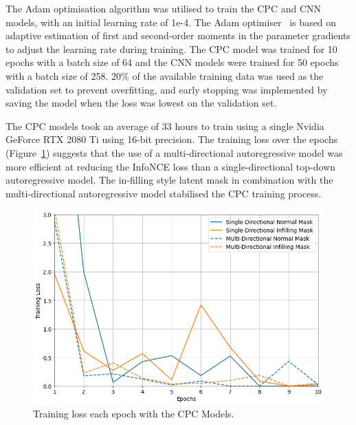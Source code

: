 The Adam optimisation algorithm was utilised to train the CPC and CNN models, with an initial learning rate of 1e-4. The Adam optimiser~\citep{kingma2014adam} is based on adaptive estimation of first and second-order moments in the parameter gradients to adjust the learning rate during training. The CPC model was trained for 10 epochs with a batch size of 64 and the CNN models were trained for 50 epochs with a batch size of 258. 20\% of the available training data was used as the validation set to prevent overfitting, and early stopping was implemented by saving the model when the loss was lowest on the validation set. 

The CPC models took an average of 33 hours to train using a single Nvidia GeForce RTX 2080 Ti using 16-bit precision. The training loss over the epochs (Figure~\ref{fig:cpc_training}) suggests that the use of a multi-directional autoregressive model was more efficient at reducing the InfoNCE loss than a single-directional top-down autoregressive model. The in-filling style latent mask in combination with the multi-directional autoregressive model stabilised the CPC training process.

\begin{figure}[h]
	\centering
	\includegraphics[width=\textwidth]{images/cpc_training.png}
	\caption{Training loss each epoch with the CPC Models.}
	\label{fig:cpc_training}
\end{figure}

